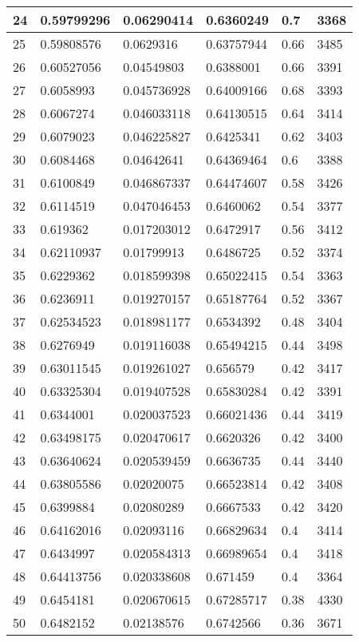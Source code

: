 \begin{longtable}{|l|l|l|l|l|l|}
24 & 0.59799296 & 0.06290414 & 0.6360249 & 0.7 & 3368 \\ \hline 
25 & 0.59808576 & 0.0629316 & 0.63757944 & 0.66 & 3485 \\ \hline 
26 & 0.60527056 & 0.04549803 & 0.6388001 & 0.66 & 3391 \\ \hline 
27 & 0.6058993 & 0.045736928 & 0.64009166 & 0.68 & 3393 \\ \hline 
28 & 0.6067274 & 0.046033118 & 0.64130515 & 0.64 & 3414 \\ \hline 
29 & 0.6079023 & 0.046225827 & 0.6425341 & 0.62 & 3403 \\ \hline 
30 & 0.6084468 & 0.04642641 & 0.64369464 & 0.6 & 3388 \\ \hline 
31 & 0.6100849 & 0.046867337 & 0.64474607 & 0.58 & 3426 \\ \hline 
32 & 0.6114519 & 0.047046453 & 0.6460062 & 0.54 & 3377 \\ \hline 
33 & 0.619362 & 0.017203012 & 0.6472917 & 0.56 & 3412 \\ \hline 
34 & 0.62110937 & 0.01799913 & 0.6486725 & 0.52 & 3374 \\ \hline 
35 & 0.6229362 & 0.018599398 & 0.65022415 & 0.54 & 3363 \\ \hline 
36 & 0.6236911 & 0.019270157 & 0.65187764 & 0.52 & 3367 \\ \hline 
37 & 0.62534523 & 0.018981177 & 0.6534392 & 0.48 & 3404 \\ \hline 
38 & 0.6276949 & 0.019116038 & 0.65494215 & 0.44 & 3498 \\ \hline 
39 & 0.63011545 & 0.019261027 & 0.656579 & 0.42 & 3417 \\ \hline 
40 & 0.63325304 & 0.019407528 & 0.65830284 & 0.42 & 3391 \\ \hline 
41 & 0.6344001 & 0.020037523 & 0.66021436 & 0.44 & 3419 \\ \hline 
42 & 0.63498175 & 0.020470617 & 0.6620326 & 0.42 & 3400 \\ \hline 
43 & 0.63640624 & 0.020539459 & 0.6636735 & 0.44 & 3440 \\ \hline 
44 & 0.63805586 & 0.02020075 & 0.66523814 & 0.42 & 3408 \\ \hline 
45 & 0.6399884 & 0.02080289 & 0.6667533 & 0.42 & 3420 \\ \hline 
46 & 0.64162016 & 0.02093116 & 0.66829634 & 0.4 & 3414 \\ \hline 
47 & 0.6434997 & 0.020584313 & 0.66989654 & 0.4 & 3418 \\ \hline 
48 & 0.64413756 & 0.020338608 & 0.671459 & 0.4 & 3364 \\ \hline 
49 & 0.6454181 & 0.020670615 & 0.67285717 & 0.38 & 4330 \\ \hline 
50 & 0.6482152 & 0.02138576 & 0.6742566 & 0.36 & 3671 \\ \hline 
\end{longtable}